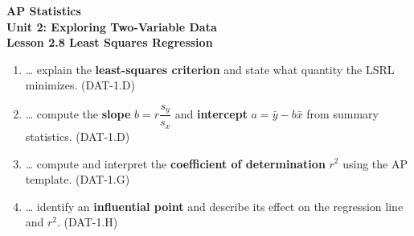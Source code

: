 \documentclass[10pt]{article}
\begin{document}
\vspace{-0.8in}

\begin{center}
  {\color{white}\textbf{\LARGE AP Statistics}}\\[4pt]
  {\color{skymid}\large\textbf{Unit 2: Exploring Two-Variable Data}}\\[6pt]
  {\color{white}\textbf{\large Lesson 2.8 \quad Least Squares Regression}}
\end{center}

\vspace{0.22in}
\namedateperiod
\vspace{0.18in}

\begin{learningtargetbox}
\small
\begin{enumerate}[leftmargin=1.5em, itemsep=5pt]
  \item \ldots{} explain the \textbf{least-squares criterion} and state what quantity the LSRL
        minimizes. \hfill\textcolor{slate}{\small(DAT-1.D)}
  \item \ldots{} compute the \textbf{slope} $b = r\dfrac{s_y}{s_x}$ and
        \textbf{intercept} $a = \bar{y} - b\bar{x}$ from summary statistics.
        \hfill\textcolor{slate}{\small(DAT-1.D)}
  \item \ldots{} compute and interpret the \textbf{coefficient of determination} $r^2$
        using the AP template. \hfill\textcolor{slate}{\small(DAT-1.G)}
  \item \ldots{} identify an \textbf{influential point} and describe its effect on the
        regression line and $r^2$. \hfill\textcolor{slate}{\small(DAT-1.H)}
\end{enumerate}
\end{learningtargetbox}

\vspace{0.14in}
\end{document}
